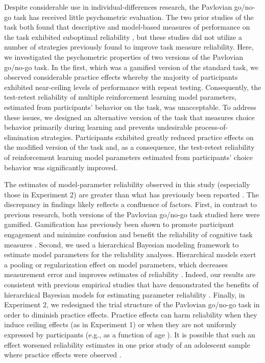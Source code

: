 \documentclass[a4paper,12pt]{article}
\begin{document}
\begin{refsection}[main]
Despite considerable use in individual-differences research, the Pavlovian go/no-go task has received little psychometric evaluation. The two prior studies of the task both found that descriptive and model-based measures of performance on the task exhibited suboptimal reliability \cite{moutoussis2018change, pike2022test}, but these studies did not utilize a number of strategies previously found to improve task measure reliability. Here, we investigated the psychometric properties of two versions of the Pavlovian go/no-go task. In the first, which was a gamified version of the standard task, we observed considerable practice effects whereby the majority of participants exhibited near-ceiling levels of performance with repeat testing. Consequently, the test-retest reliability of multiple reinforcement learning model parameters, estimated from participants' behavior on the task, was unacceptable. To address these issues, we designed an alternative version of the task that measures choice behavior primarily during learning and prevents undesirable process-of-elimination strategies. Participants exhibited greatly reduced practice effects on the modified version of the task and, as a consequence, the test-retest reliability of reinforcement learning model parameters estimated from participants' choice behavior was significantly improved.

The estimates of model-parameter reliability observed in this study (especially those in Experiment 2) are greater than what has previously been reported \cite{moutoussis2018change, pike2022test}. The discrepancy in findings likely reflects a confluence of factors. First, in contrast to previous research, both versions of the Pavlovian go/no-go task studied here were gamified. Gamification has previously been shown to promote participant engagement and minimize confusion \cite{sailer2017gamification} and benefit the reliability of cognitive task measures \cite{kucina2022solution, verdejo2021unified}. Second, we used a hierarchical Bayesian modeling framework to estimate model parameters for the reliability analyses. Hierarchical models exert a pooling or regularization effect on model parameters, which decreases measurement error and improves estimates of reliability \cite{rouder2019psychometrics, haines2023classical}. Indeed, our results are consistent with previous empirical studies that have demonstrated the benefits of hierarchical Bayesian models for estimating parameter reliability \cite{brown2020improving, waltmann2022sufficient}. Finally, in Experiment 2, we redesigned the trial structure of the Pavlovian go/no-go task in order to diminish practice effects. Practice effects can harm reliability when they induce ceiling effects (as in Experiment 1) or when they are not uniformly expressed by participants (e.g., as a function of age \cite{anokhin2022age}). It is possible that such an effect worsened reliability estimates in one prior study of an adolescent sample where practice effects were observed \cite{moutoussis2018change}. 


\end{refsection}
\end{document}
